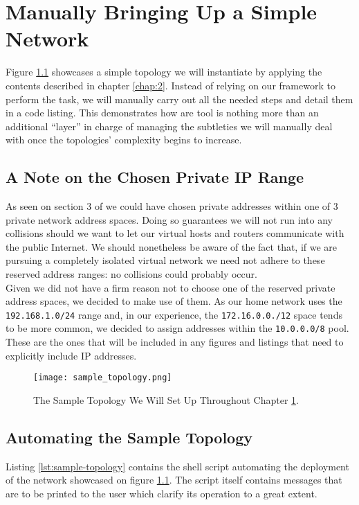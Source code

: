 \chapter{Manually Bringing Up a Simple Network} \label{chap:3}
    Figure \ref{fig:sample-topology} showcases a simple topology we will instantiate by applying the contents described in chapter \ref{chap:2}. Instead of relying on our framework to perform the task, we will manually carry out all the needed steps and detail them in a code listing. This demonstrates how are tool is nothing more than an additional ``layer'' in charge of managing the subtleties we will manually deal with once the topologies' complexity begins to increase.\\

    \section{A Note on the Chosen Private IP Range}
        As seen on section $3$ of \cite{bib:rfc1918} we could have chosen private addresses within one of $3$ private network address spaces. Doing so guarantees we will not run into any collisions should we want to let our virtual hosts and routers communicate with the public Internet. We should nonetheless be aware of the fact that, if we are pursuing a completely isolated virtual network we need not adhere to these reserved address ranges: no collisions could probably occur.\\

        Given we did not have a firm reason not to choose one of the reserved private address spaces, we decided to make use of them. As our home network uses the \texttt{192.168.1.0/24} range and, in our experience, the \texttt{172.16.0.0./12} space tends to be more common, we decided to assign addresses within the \texttt{10.0.0.0/8} pool. These are the ones that will be included in any figures and listings that need to explicitly include IP addresses.\\

    \begin{figure}
        \centering
        \texttt{[image: sample\_topology.png]}
        \caption[A Sample Topology]{The Sample Topology We Will Set Up Throughout Chapter \ref{chap:3}.}
        \label{fig:sample-topology}
    \end{figure}

    \section{Automating the Sample Topology}
        Listing \ref{lst:sample-topology} contains the shell script automating the deployment of the network showcased on figure \ref{fig:sample-topology}. The script itself contains messages that are to be printed to the user which clarify its operation to a great extent.\\

